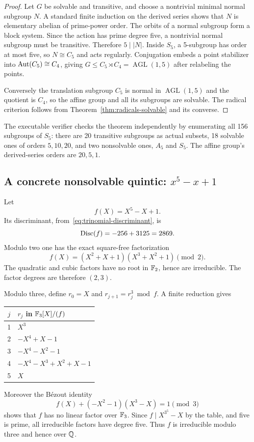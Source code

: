\begin{proof}
Let \(G\) be solvable and transitive, and choose a nontrivial minimal normal
subgroup \(N\).  A standard finite induction on the derived series shows that
\(N\) is elementary abelian of prime-power order.  The orbits of a normal
subgroup form a block system.  Since the action has prime degree five, a
nontrivial normal subgroup must be transitive.  Therefore \(5\mid |N|\).
Inside \(S_5\), a 5-subgroup has order at most five, so \(N\cong C_5\) and acts
regularly.  Conjugation embeds a point stabilizer into
\(\operatorname{Aut}(C_5)\cong C_4\), giving
\(G\le C_5\rtimes C_4=\operatorname{AGL}(1,5)\) after relabeling the points.

Conversely the translation subgroup \(C_5\) is normal in
\(\operatorname{AGL}(1,5)\) and the quotient is \(C_4\), so the affine group
and all its subgroups are solvable.  The radical criterion follows from
Theorem~\ref{thm:radicals-solvable} and its converse.
\end{proof}

The executable verifier checks the theorem independently by enumerating all
156 subgroups of \(S_5\): there are 20 transitive subgroups as actual subsets,
18 solvable ones of orders \(5,10,20\), and two nonsolvable ones, \(A_5\) and
\(S_5\).  The affine group's derived-series orders are \(20,5,1\).

\subsection{A concrete nonsolvable quintic: \(x^5-x+1\)}

Let
\[
 f(X)=X^5-X+1.
\]
Its discriminant, from~\eqref{eq:trinomial-discriminant}, is
\[
 \operatorname{Disc}(f)=-256+3125=2869.
\]
Modulo two one has the exact square-free factorization
\begin{equation}\label{eq:f-mod2}
 f(X)=(X^2+X+1)(X^3+X^2+1)\pmod2.
\end{equation}
The quadratic and cubic factors have no root in \(\mathbb F_2\), hence are
irreducible.  The factor degrees are therefore \((2,3)\).

Modulo three, define \(r_0=X\) and
\(r_{j+1}=r_j^3\bmod f\).  A finite reduction gives
\begin{center}
\begin{tabular}{c|l}
\toprule
\(j\)&\(r_j\) in \(\mathbb F_3[X]/(f)\)\\
\midrule
1&\(X^3\)\\
2&\(-X^4+X-1\)\\
3&\(-X^4-X^2-1\)\\
4&\(-X^4-X^3+X^2+X-1\)\\
5&\(X\)\\
\bottomrule
\end{tabular}
\end{center}
Moreover the Bézout identity
\begin{equation}\label{eq:f-bezout3}
 f(X)+(-X^2-1)(X^3-X)=1\pmod3
\end{equation}
shows that \(f\) has no linear factor over \(\mathbb F_3\).  Since
\(f\mid X^{3^5}-X\) by the table, and five is prime, all irreducible factors
have degree five.  Thus \(f\) is irreducible modulo three and hence over
\(\mathbb Q\).

